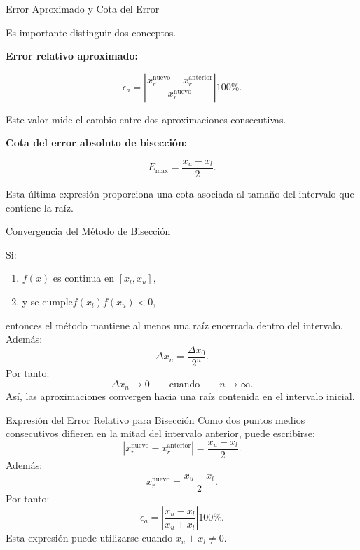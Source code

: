 \documentclass[../../main.tex]{subfiles}
\begin{document}
\begin{frame}{Error Aproximado y Cota del Error}

Es importante distinguir dos conceptos.

\textbf{Error relativo aproximado:}

\[
\epsilon_a
=
\left|
\frac{
x_r^{\text{nuevo}}
-
x_r^{\text{anterior}}
}{
x_r^{\text{nuevo}}
}
\right|
100\%.
\]

Este valor mide el cambio entre dos aproximaciones consecutivas.

\vspace{0.3cm}

\textbf{Cota del error absoluto de bisección:}

\[
E_{\max}
=
\frac{x_u-x_l}{2}.
\]

Esta última expresión proporciona una cota asociada al tamaño del intervalo que contiene la raíz.

\end{frame}



\begin{frame}{Convergencia del Método de Bisección}

Si:

\begin{enumerate}

    \item \(f(x)\) es continua en \([x_l,x_u],\)
    \item y se cumple\(f(x_l)f(x_u)<0, \)

\end{enumerate}

entonces el método mantiene al menos una raíz encerrada dentro del intervalo.
Además:
\[
\Delta x_n
=
\frac{\Delta x_0}{2^n}.
\]
Por tanto:
\[
\Delta x_n\rightarrow0
\qquad
\text{cuando}
\qquad
n\rightarrow\infty.
\]
Así, las aproximaciones convergen hacia una raíz contenida en el intervalo inicial.

\end{frame}



\begin{frame}{Expresión del Error Relativo para Bisección}
Como dos puntos medios consecutivos difieren en la mitad del intervalo anterior, puede escribirse:
\[
\left|
x_r^{\text{nuevo}}
-
x_r^{\text{anterior}}
\right|
=
\frac{x_u-x_l}{2}.
\]
Además:
\[
x_r^{\text{nuevo}}
=
\frac{x_u+x_l}{2}.
\]
Por tanto:
\[
\epsilon_a
=
\left|
\frac{x_u-x_l}{x_u+x_l}
\right|
100\%.
\]
Esta expresión puede utilizarse cuando \(x_u+x_l\neq0\).

\end{frame}
\end{document}
